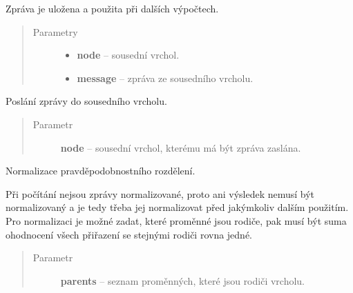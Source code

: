 \begin{fulllineitems}
\begin{fulllineitems}
Zpráva je uložena a použita při dalších výpočtech.
\begin{quote}\begin{description}
\item[{Parametry}] \leavevmode\begin{itemize}
\item {} 
\textbf{node} -- sousední vrchol.

\item {} 
\textbf{message} -- zpráva ze sousedního vrcholu.

\end{itemize}

\end{description}\end{quote}

\end{fulllineitems}


\begin{fulllineitems}
\label{alex.infer:alex.infer.factor.alex.infer.node.Node.message_to}
Poslání zprávy do sousedního vrcholu.
\begin{quote}\begin{description}
\item[{Parametr}] \leavevmode
\textbf{node} -- sousední vrchol, kterému má být zpráva zaslána.

\end{description}\end{quote}

\end{fulllineitems}


\begin{fulllineitems}
\label{alex.infer:alex.infer.factor.alex.infer.node.Node.normalize}
Normalizace pravděpodobnostního rozdělení.

Při počítání nejsou zprávy normalizované, proto ani výsledek nemusí být
normalizovaný a je tedy třeba jej normalizovat před jakýmkoliv dalším
použitím. Pro normalizaci je možné zadat, které proměnné jsou rodiče,
pak musí být suma ohodnocení všech přiřazení se stejnými rodiči rovna
jedné.
\begin{quote}\begin{description}
\item[{Parametr}] \leavevmode
\textbf{parents} -- seznam proměnných, které jsou rodiči vrcholu.


\end{description}
\end{quote}
\end{fulllineitems}
\end{fulllineitems}

